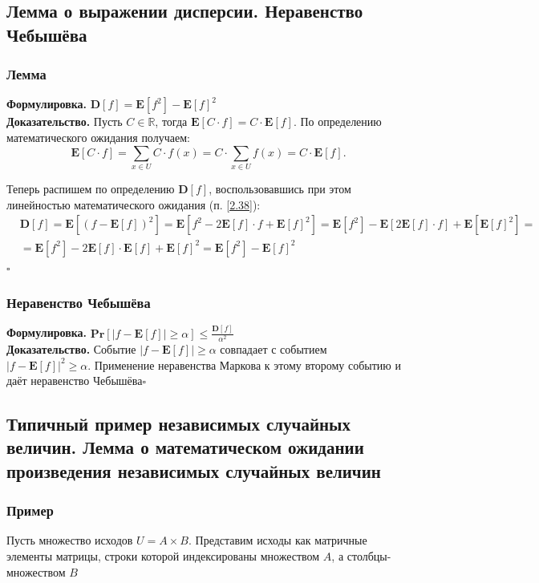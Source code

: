 \documentclass[a4paper]{article}
\newcommand{\qed}{\hfill$\square$}
\begin{document}
\subsection{Лемма о выражении дисперсии. Неравенство Чебышёва}
\subsubsection*{Лемма}
\textbf{Формулировка.} $\textbf{D}[f]=\textbf{E}[f^2]-\textbf{E}[f]^2$\\[4mm]
\indent\textbf{Доказательство.} Пусть $C \in \mathbb{R}$, тогда $\mathbf{E}[C \cdot f]=C \cdot \mathbf{E}[f]$. По определению математического ожидания получаем:
$$
\mathbf{E}[C \cdot f]=\sum_{x \in U} C \cdot f(x)=C \cdot \sum_{x \in U} f(x)=C \cdot \mathbf{E}[f] .
$$

Теперь распишем по определению $\mathbf{D}[f]$, воспользовавшись при этом линейностью математического ожидания (п. \ref{2.38}):
$$
\begin{aligned}
& \mathbf{D}[f]=\mathbf{E}\left[(f-\mathbf{E}[f])^2\right]=\mathbf{E}\left[f^2-2 \mathbf{E}[f] \cdot f+\mathbf{E}[f]^2\right]=\mathbf{E}\left[f^2\right]-\mathbf{E}[2 \mathbf{E}[f] \cdot f]+\mathbf{E}\left[\mathbf{E}[f]^2\right]= \\
& =\mathbf{E}\left[f^2\right]-2 \mathbf{E}[f] \cdot \mathbf{E}[f]+\mathbf{E}[f]^2=\mathbf{E}\left[f^2\right]-\mathbf{E}[f]^2
\end{aligned}
$$\qed

\subsubsection*{Неравенство Чебышёва}
\textbf{Формулировка.} $\textbf{Pr}\left[\left|f-\textbf{E}[f]\right|\geqslant\alpha\right]\leqslant\displaystyle\frac{\textbf{D}[f]}{\alpha^2}$\\[4mm]
\indent\textbf{Доказательство.} Событие $\left|f-\textbf{E}[f]\right|\geqslant\alpha$ совпадает с событием $\left|f-\textbf{E}[f]\right|^2\geqslant\alpha$. Применение неравенства Маркова к этому второму событию и даёт неравенство Чебышёва\qed

\subsection{Типичный пример независимых случайных величин. Лемма о математическом ожидании произведения независимых случайных величин}
\subsubsection*{Пример}\label{2.43}
Пусть множество исходов $U=A \times B$. Представим исходы как матричные элементы матрицы, строки которой индексированы множеством $A$, а столбцы-множеством $B$
\end{document}
